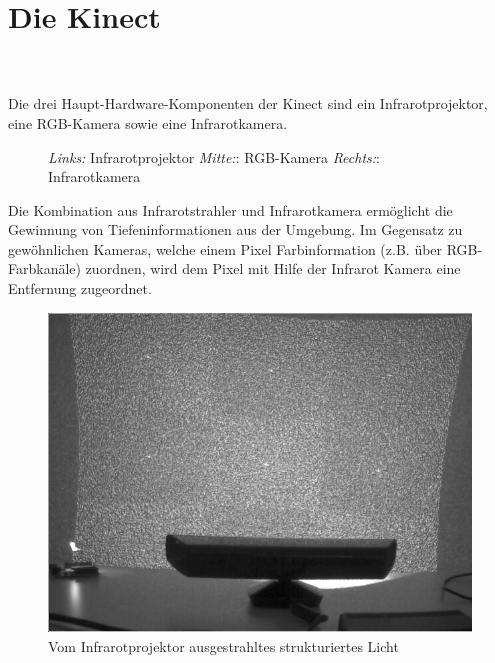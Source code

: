 \chapter{Die Kinect}
\label{ch:kinect}
\\\\
Die drei Haupt-Hardware-Komponenten der Kinect sind ein Infrarotprojektor, eine RGB-Kamera sowie eine Infrarotkamera.\\
\begin{figure}[!ht]
  \centering
   \caption{\emph {Links:} Infrarotprojektor \emph {Mitte:}: RGB-Kamera  \emph {Rechts:}: Infrarotkamera }
\end{figure}
Die Kombination aus Infrarotstrahler und Infrarotkamera ermöglicht die Gewinnung von Tiefeninformationen aus der Umgebung. Im Gegensatz zu gewöhnlichen Kameras, welche einem Pixel Farbinformation (z.B.  über RGB-Farbkanäle) zuordnen, wird dem Pixel mit Hilfe der Infrarot Kamera eine Entfernung zugeordnet.

\begin{figure}
\centering
\includegraphics[width=0.5\linewidth]{./Res/Kinect_9Points}
\caption{Vom Infrarotprojektor ausgestrahltes strukturiertes Licht}
\label{fig:Kinect_9Points}
\end{figure}


